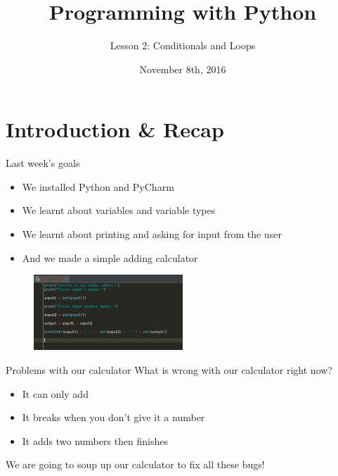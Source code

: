 \documentclass{beamer}
\title{Programming with Python}
\subtitle{Lesson 2: Conditionals and Loops}
\date{November 8th, 2016}
\begin{document}
\begin{frame}
  \titlepage
\end{frame}


\section{Introduction \& Recap}

\begin{frame}{Last week's goals}
\pause
\begin{itemize}
  \item We installed Python and PyCharm
  \pause
  \item We learnt about variables and variable types
  \pause
  \item We learnt about printing and asking for input from the user
  \pause
  \item And we made a simple adding calculator
  \end{itemize}

\pause

\begin{figure}[h]
\includegraphics[width=0.5\textwidth]{calc}
\end{figure}

\end{frame}

\begin{frame}{Problems with our calculator}
What is wrong with our calculator right now?

\pause

\begin{itemize}
  \item It can only add
  \pause
  \item It breaks when you don't give it a number
  \pause
  \item It adds two numbers then finishes
\end{itemize}

\pause

We are going to soup up our calculator to fix all these bugs!

\end{frame}
\end{document}
